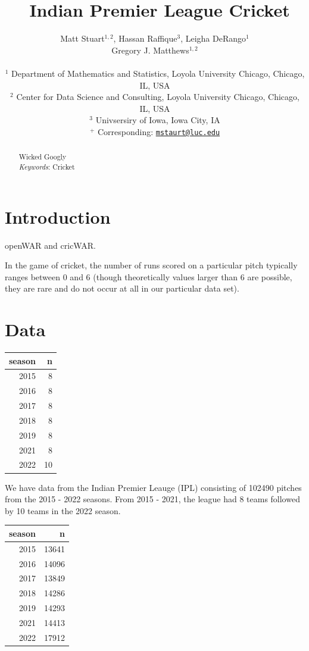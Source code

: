 \documentclass[
  12pt,
]{article}
\title{~\Large Indian Premier League Cricket}
\author{\large Matt Stuart\(^{1,2}\), Hassan Raffique\(^{3}\), Leigha
DeRango\(^1\)\\
\large Gregory J. Matthews\(^{1,2}\)\\
\vspace{-1.1mm}\\
\large \(^1\) Department of Mathematics and Statistics, Loyola
University Chicago, Chicago, IL, USA \vspace{-1.1mm}\\
\large \(^2\) Center for Data Science and Consulting, Loyola University
Chicago, Chicago, IL, USA \vspace{-1.1mm}\\
\large \(^3\) Univsersiry of Iowa, Iowa City, IA \vspace{-1.1mm}\\
\large \(^+\) Corresponding:
\href{mailto:mstaurt@luc.edu}{\nolinkurl{mstaurt@luc.edu}}
\vspace{-1.1mm}}
\date{}
\begin{document}
\maketitle
\begin{abstract}
Wicked Googly \vspace{2mm}\\
\emph{Keywords}: Cricket
\end{abstract}

\newcommand{\iid}{\overset{iid}{\sim}}

\newpage

\hypertarget{sec:intro}{%
\section{Introduction}\label{sec:intro}}

openWAR and cricWAR.

In the game of cricket, the number of runs scored on a particular pitch
typically ranges between 0 and 6 (though theoretically values larger
than 6 are possible, they are rare and do not occur at all in our
particular data set).

\hypertarget{sec:data}{%
\section{Data}\label{sec:data}}

\begin{longtable}[]{@{}rr@{}}
\toprule()
season & n \\
\midrule()
\endhead
2015 & 8 \\
2016 & 8 \\
2017 & 8 \\
2018 & 8 \\
2019 & 8 \\
2021 & 8 \\
2022 & 10 \\
\bottomrule()
\end{longtable}

We have data from the Indian Premier Leauge (IPL) consisting of 102490
pitches from the 2015 - 2022 seasons. From 2015 - 2021, the league had 8
teams followed by 10 teams in the 2022 season.

\begin{longtable}[]{@{}rr@{}}
\toprule()
season & n \\
\midrule()
\endhead
2015 & 13641 \\
2016 & 14096 \\
2017 & 13849 \\
2018 & 14286 \\
2019 & 14293 \\
2021 & 14413 \\
2022 & 17912 \\
\bottomrule()
\end{longtable}
\end{document}
